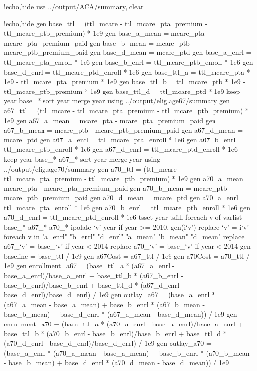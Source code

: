 \documentclass{article}
\begin{document}
\begin{Statacode}{!echo,hide}
use ../output/ACA/summary, clear
\end{Statacode}
\begin{Statacode}{!echo,hide}
gen base_ttl = (ttl_mcare - ttl_mcare_pta_premium - ttl_mcare_ptb_premium) * 1e9
gen base_a_mean = mcare_pta - mcare_pta_premium_paid
gen base_b_mean = mcare_ptb - mcare_ptb_premium_paid
gen base_d_mean = mcare_ptd
gen base_a_enrl = ttl_mcare_pta_enroll * 1e6
gen base_b_enrl = ttl_mcare_ptb_enroll * 1e6
gen base_d_enrl = ttl_mcare_ptd_enroll * 1e6
gen base_ttl_a = ttl_mcare_pta * 1e9 - ttl_mcare_pta_premium * 1e9
gen base_ttl_b = ttl_mcare_ptb * 1e9 - ttl_mcare_ptb_premium * 1e9
gen base_ttl_d = ttl_mcare_ptd * 1e9
keep year base_*
sort year
merge year using ../output/elig.age67/summary
gen a67_ttl = (ttl_mcare - ttl_mcare_pta_premium - ttl_mcare_ptb_premium) * 1e9
gen a67_a_mean = mcare_pta - mcare_pta_premium_paid
gen a67_b_mean = mcare_ptb - mcare_ptb_premium_paid
gen a67_d_mean = mcare_ptd
gen a67_a_enrl = ttl_mcare_pta_enroll * 1e6
gen a67_b_enrl = ttl_mcare_ptb_enroll * 1e6
gen a67_d_enrl = ttl_mcare_ptd_enroll * 1e6
keep year base_* a67_*
sort year
merge year using ../output/elig.age70/summary
gen a70_ttl = (ttl_mcare - ttl_mcare_pta_premium - ttl_mcare_ptb_premium) * 1e9
gen a70_a_mean = mcare_pta - mcare_pta_premium_paid
gen a70_b_mean = mcare_ptb - mcare_ptb_premium_paid
gen a70_d_mean = mcare_ptd
gen a70_a_enrl = ttl_mcare_pta_enroll * 1e6
gen a70_b_enrl = ttl_mcare_ptb_enroll * 1e6
gen a70_d_enrl = ttl_mcare_ptd_enroll * 1e6
tsset year
tsfill
foreach v of varlist base_* a67_* a70_* {
  ipolate `v' year if year >= 2010, gen(i`v')
  replace `v' = i`v'
}
foreach v in "a_enrl" "b_enrl" "d_enrl" "a_mean" "b_mean" "d_mean" {
  replace a67_`v' = base_`v' if year < 2014
  replace a70_`v' = base_`v' if year < 2014
} 
gen baseline = base_ttl / 1e9
gen a67Cost = a67_ttl / 1e9
gen a70Cost = a70_ttl / 1e9
gen enrollment_a67 = (base_ttl_a * (a67_a_enrl - base_a_enrl)/base_a_enrl + base_ttl_b * (a67_b_enrl - base_b_enrl)/base_b_enrl + base_ttl_d * (a67_d_enrl - base_d_enrl)/base_d_enrl) / 1e9
gen outlay_a67 = (base_a_enrl * (a67_a_mean - base_a_mean) + base_b_enrl * (a67_b_mean - base_b_mean) + base_d_enrl * (a67_d_mean - base_d_mean)) / 1e9
gen enrollment_a70 = (base_ttl_a * (a70_a_enrl - base_a_enrl)/base_a_enrl + base_ttl_b * (a70_b_enrl - base_b_enrl)/base_b_enrl + base_ttl_d * (a70_d_enrl - base_d_enrl)/base_d_enrl) / 1e9
gen outlay_a70 = (base_a_enrl * (a70_a_mean - base_a_mean) + base_b_enrl * (a70_b_mean - base_b_mean) + base_d_enrl * (a70_d_mean - base_d_mean)) / 1e9

\end{Statacode}
\end{document}
